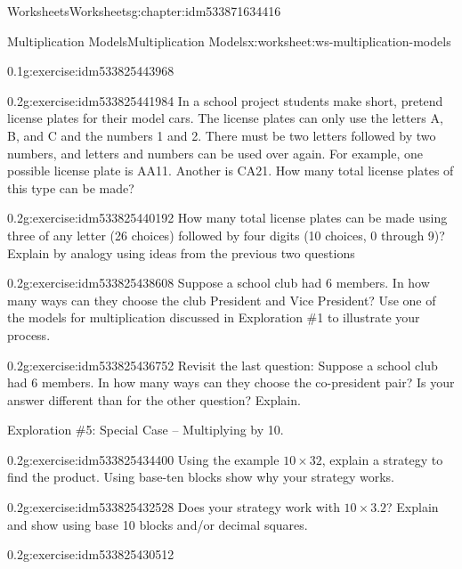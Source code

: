 \documentclass[twoside,11pt,]{book}
\begin{document}
\begin{chapterptx}{Worksheets}{}{Worksheets}{}{}{g:chapter:idm533871634416}
\begin{worksheet-section-numberless}{Multiplication Models}{}{Multiplication Models}{}{}{x:worksheet:ws-multiplication-models}
\begin{divisionexercise}{11}{}{0.1}{g:exercise:idm533825443968}
\end{divisionexercise}%
\clearpage
\begin{divisionexercise}{12}{}{0.2}{g:exercise:idm533825441984}%
In a school project students make short, pretend license plates for their model cars.  The license plates can only use the letters A, B, and C and the numbers 1 and 2.  There must be two letters followed by two numbers, and letters and numbers can be used over again.  For example, one possible license plate is AA11. Another is CA21. How many total license plates of this type can be made?%
\end{divisionexercise}%
\begin{divisionexercise}{13}{}{0.2}{g:exercise:idm533825440192}%
How many total license plates can be made using three of any letter (26 choices) followed by four digits (10 choices, 0 through 9)?  Explain by analogy using ideas from the previous two questions%
\end{divisionexercise}%
\begin{divisionexercise}{14}{}{0.2}{g:exercise:idm533825438608}%
Suppose a school club had 6 members. In how many ways can they choose the club President and Vice President? Use one of the models for multiplication discussed in Exploration \#1 to illustrate your process.%
\end{divisionexercise}%
\clearpage
\begin{divisionexercise}{15}{}{0.2}{g:exercise:idm533825436752}%
Revisit the last question: Suppose a school club had 6 members. In how many ways can they choose the co-president pair? Is your answer different than for the other question?  Explain.%
\end{divisionexercise}%
\begin{introduction}{}%
Exploration \#5: Special Case – Multiplying by 10.\end{introduction}%
\begin{divisionexercise}{16}{}{0.2}{g:exercise:idm533825434400}%
Using the example \(10 \times 32 \), explain a strategy to find the product. Using base-ten blocks show why your strategy works.%
\end{divisionexercise}%
\begin{divisionexercise}{17}{}{0.2}{g:exercise:idm533825432528}%
Does your strategy work with \(10 \times 3.2 \)? Explain and show using base 10 blocks and\slash{}or decimal squares.%
\end{divisionexercise}%
\clearpage
\begin{divisionexercise}{18}{}{0.2}{g:exercise:idm533825430512}%

\end{divisionexercise}
\end{worksheet-section-numberless}
\end{chapterptx}
\end{document}
